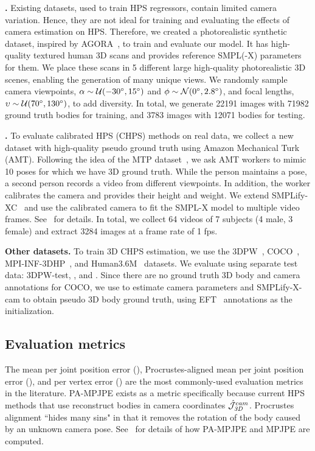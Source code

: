 \documentclass[10pt,twocolumn,letterpaper,usenames,dvipsnames]{article}
\begin{document}
\textbf{\agoracam.} Existing datasets, used to train HPS regressors, contain limited camera variation. Hence, they are not ideal for training and evaluating the effects of camera estimation on HPS. 
Therefore, we created a photorealistic synthetic dataset, inspired by AGORA~\cite{patel2021agora}, to train and evaluate our model. 
It has high-quality textured human 3D scans and provides reference SMPL(-X) parameters for them. 
We place these scans in 5 different large high-quality photorealistic 3D scenes, enabling the generation of many unique views. 
We randomly sample camera viewpoints, $\alpha \sim \mathcal{U}(-30^{\circ}, 15^{\circ})$ and $\phi \sim \mathcal{N}(0^{\circ}, 2.8^{\circ})$, and focal lengths, $\upsilon \sim \mathcal{U}(70^{\circ}, 130^{\circ})$, to add diversity.
In total, we generate 22191 images with 71982 ground truth bodies for training, and 3783 images with 12071 bodies for testing. 

\textbf{\mtpcam.} 
To evaluate calibrated HPS (CHPS) methods on real data, we collect a new dataset with high-quality pseudo ground truth using Amazon Mechanical Turk (AMT).
Following the idea of the MTP dataset~\cite{Mueller:CVPR:21}, we ask AMT workers to mimic 10 poses for which we have 3D ground truth. 
While the person maintains a pose, a second person records a video from different viewpoints.
In addition, the worker calibrates the camera
and provides their height and weight.
We extend SMPLify-XC~\cite{Mueller:CVPR:21} and use the calibrated camera to fit the SMPL-X model to multiple video frames. See \supmat~for details.
In total, we collect 64 videos of 7 subjects (4 male, 3 female) and extract 3284 
images at a frame rate of 1 fps. 

\textbf{Other datasets.} 
To train 3D CHPS estimation, we use the 3DPW~\cite{vonMarcard2018_3dpw}, COCO~\cite{coco}, MPI-INF-3DHP~\cite{mpiiinf3dhp_mono-2017}, and Human3.6M~\cite{ionescu_h36m} datasets. 
We evaluate \methodname using separate test data: 3DPW-test, \agoracam, and \mtpcam. 
Since there are no ground truth 3D body and camera annotations for COCO, we use \camcalib to estimate camera parameters and SMPLify-X-cam to obtain pseudo 3D body ground truth, using EFT~\cite{joo2020eft} annotations as the initialization.


\subsection{Evaluation metrics} 
\label{sec:metrics}
The mean per joint position error (\mpjpe), Procrustes-aligned mean per joint position error (\pampjpe), and per vertex error (\pve) are the most commonly-used evaluation metrics in the literature. 
PA-MPJPE exists as a metric specifically because current HPS methods that use \iwcam reconstruct bodies in camera coordinates $\hat{\mathcal{J}}_{\mathit{3D}}^{cam}$. Procrustes alignment ``hides many sins" in that it removes the rotation of the body caused by an unknown camera pose. 
See \supmat~for details of how PA-MPJPE and MPJPE are computed.
\end{document}
